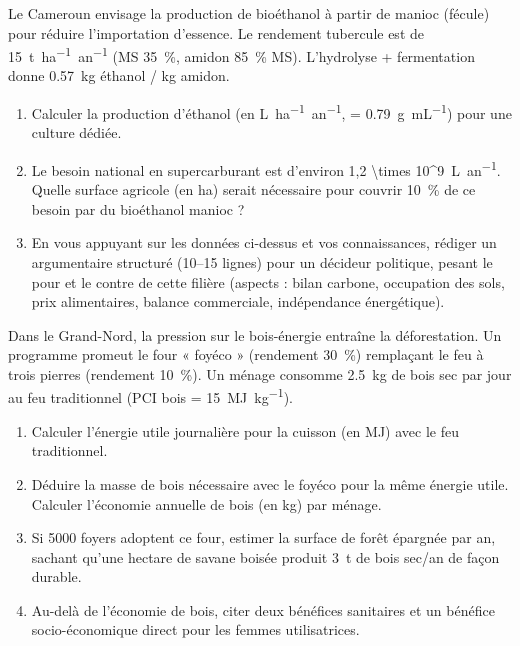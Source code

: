 \documentclass[11pt]{article}
\begin{document}
\begin{exercice}
Le Cameroun envisage la production de bioéthanol à partir de manioc (fécule) pour réduire l'importation d'essence. Le rendement tubercule est de \SI{15}{t.ha^{-1}.an^{-1}} (MS \SI{35}{\%}, amidon \SI{85}{\%} MS). L'hydrolyse + fermentation donne \SI{0,57}{kg} éthanol / kg amidon.
\begin{enumerate}
    \item Calculer la production d'éthanol (en \si{L.ha^{-1}.an^{-1}}, \rho = \SI{0,79}{g.mL^{-1}}) pour une culture dédiée.
    \item Le besoin national en supercarburant est d'environ \SI{1,2 \times 10^9}{L.an^{-1}}. Quelle surface agricole (en ha) serait nécessaire pour couvrir \SI{10}{\%} de ce besoin par du bioéthanol manioc ?
    \item En vous appuyant sur les données ci-dessus et vos connaissances, rédiger un argumentaire structuré (10--15 lignes) pour un décideur politique, pesant le pour et le contre de cette filière (aspects : bilan carbone, occupation des sols, prix alimentaires, balance commerciale, indépendance énergétique).
\end{enumerate}
\end{exercice}

\begin{exercice}
Dans le Grand-Nord, la pression sur le bois-énergie entraîne la déforestation. Un programme promeut le four « foyéco » (rendement \SI{30}{\%}) remplaçant le feu à trois pierres (rendement \SI{10}{\%}). Un ménage consomme \SI{2,5}{kg} de bois sec par jour au feu traditionnel (PCI bois = \SI{15}{MJ.kg^{-1}}).
\begin{enumerate}
    \item Calculer l'énergie utile journalière pour la cuisson (en MJ) avec le feu traditionnel.
    \item Déduire la masse de bois nécessaire avec le foyéco pour la même énergie utile. Calculer l'économie annuelle de bois (en kg) par ménage.
    \item Si 5000 foyers adoptent ce four, estimer la surface de forêt épargnée par an, sachant qu'une hectare de savane boisée produit \SI{3}{t} de bois sec/an de façon durable.
    \item Au-delà de l'économie de bois, citer deux bénéfices sanitaires et un bénéfice socio-économique direct pour les femmes utilisatrices.
\end{enumerate}
\end{exercice}
\end{document}
